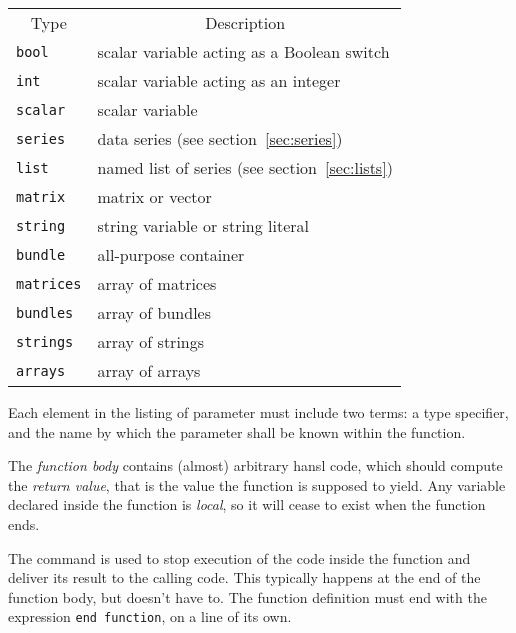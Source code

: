 \begin{center}
\begin{tabular}{ll}
  \multicolumn{1}{c}{Type} &
  \multicolumn{1}{c}{Description} \\ [4pt]
  \texttt{bool}   & scalar variable acting as a Boolean switch \\
  \texttt{int}    & scalar variable acting as an integer  \\
  \texttt{scalar} & scalar variable \\
  \texttt{series} & data series (see section~\ref{sec:series})\\
  \texttt{list}   & named list of series  (see section~\ref{sec:lists})\\
  \texttt{matrix} & matrix or vector \\
  \texttt{string} & string variable or string literal \\
  \texttt{bundle} & all-purpose container \\
  \texttt{matrices} & array of matrices \\
  \texttt{bundles}  & array of bundles \\
  \texttt{strings}  & array of strings \\
  \texttt{arrays}   & array of arrays \\
\end{tabular}
\end{center}

Each element in the listing of parameter must include two terms: a
type specifier, and the name by which the parameter shall be known
within the function.

The \emph{function body} contains (almost) arbitrary hansl code, which
should compute the \emph{return value}, that is the value the function
is supposed to yield. Any variable declared inside the function is
\emph{local}, so it will cease to exist when the function ends.

The  command is used to stop execution of the code inside
the function and deliver its result to the calling code. This
typically happens at the end of the function body, but doesn't have
to. The function definition must end with the expression
\verb|end function|, on a line of its own.


